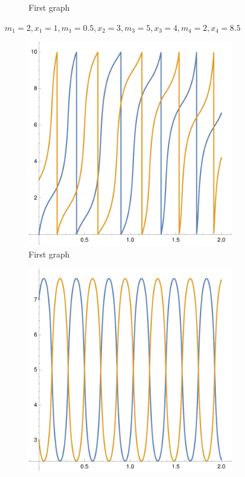 \documentclass[english,master]{liumaiex}
\theoremstyle{plain}
\theoremstyle{definition}
\begin{document}
\begin{figure}[H]
\begin{subfigure}{0.44\textwidth}
        \caption{First graph}
    \end{subfigure}
    \caption{$m_1 = 2, x_1 = 1, m_1 = 0.5, x_2 = 3, m_3 = 5, x_3 = 4, m_4 = 2, x_4 = 8.5$}
\end{figure}

\begin{figure}[H]
	\begin{subfigure}{0.3\textwidth}
        \includegraphics[width=\textwidth]{graphs/per2N/x.pdf}
        \caption{First graph}
    \end{subfigure}
	\hfill
	\begin{subfigure}{0.3\textwidth}
        \includegraphics[width=\textwidth]{graphs/per2N/xDist.pdf}

\end{subfigure}
\end{figure}
\end{document}
